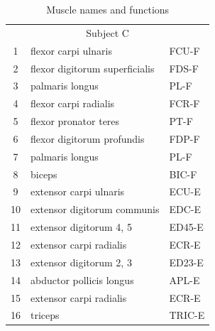 \begin{table}[ht]
\begin{tabular}{cll}
			\midrule
			\multicolumn{3}{c}{Subject C} \\
			1  &	flexor carpi ulnaris            &	FCU-F\\
			2  &  	flexor digitorum superficialis	&	FDS-F\\
			3  &	palmaris longus                 &	PL-F\\ 
			4  &	flexor carpi radialis 	        &	FCR-F\\
			5  &	flexor pronator teres 	        &	PT-F\\
			6  &	flexor digitorum profundis      &	FDP-F\\
			7  &	palmaris longus 	            &	PL-F\\
			8  &	biceps 		                    &	BIC-F\\
			9  &	extensor carpi ulnaris		    &	ECU-E\\
			10 & 	extensor digitorum communis 	&	EDC-E\\
			11 & 	extensor digitorum 4, 5			&	ED45-E\\
			12 &	extensor carpi radialis 		&	ECR-E\\
			13 & 	extensor digitorum 2, 3 		&	ED23-E\\
			14 & 	abductor pollicis longus		&	APL-E\\
			15 &	extensor carpi radialis 		&	ECR-E\\
			16 & 	triceps 			            &	TRIC-E\\
		\bottomrule
 	\end{tabular}
 	\caption{Muscle names and functions}
 	\label{app:tab:muscle_naming}
\end{table}

